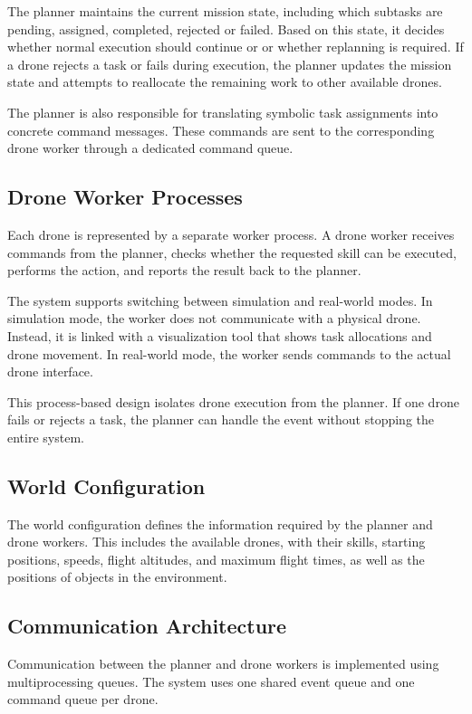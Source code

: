 The planner maintains the current mission state, including which subtasks are pending, assigned, completed, rejected or failed.
Based on this state, it decides whether normal execution should continue or or whether replanning is required.
If a drone rejects a task or fails during execution, 
the planner updates the mission state and attempts to reallocate the remaining work to other available drones.

The planner is also responsible for translating symbolic task assignments into concrete command messages. 
These commands are sent to the corresponding drone worker through a dedicated command queue.

\subsection{Drone Worker Processes}

Each drone is represented by a separate worker process. 
A drone worker receives commands from the planner, checks whether the requested skill can be executed, performs the action, 
and reports the result back to the planner.

The system supports switching between simulation and real-world modes.
In simulation mode, the worker does not communicate with a physical drone. 
Instead, it is linked with a visualization tool that shows task allocations and drone movement.
In real-world mode, the worker sends commands to the actual drone interface.

This process-based design isolates drone execution from the planner.
If one drone fails or rejects a task, the planner can handle the event without stopping the entire system.

\subsection{World Configuration}

The world configuration defines the information required by the planner and drone workers.
This includes the available drones, with their skills, starting positions, speeds, flight altitudes, and maximum flight times, 
as well as the positions of objects in the environment.

\subsection{Communication Architecture}

Communication between the planner and drone workers is implemented using multiprocessing queues. 
The system uses one shared event queue and one command queue per drone.

